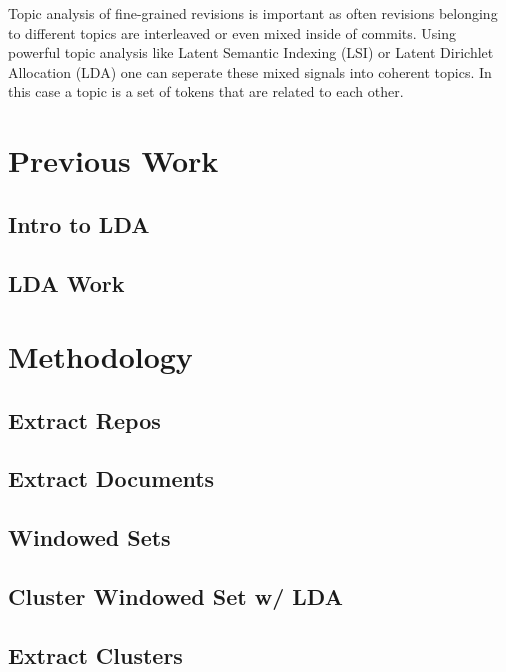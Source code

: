 \documentclass{report}
\begin{document}
Topic analysis of fine-grained revisions is important as often
revisions belonging to different topics are interleaved or even mixed
inside of commits. Using powerful topic analysis like Latent Semantic
Indexing (LSI) or Latent Dirichlet Allocation (LDA) one can seperate
these mixed signals into coherent topics. In this case a topic is a
set of tokens that are related to each other.

\section{Previous Work}
\subsection{Intro to LDA}

\subsection{LDA Work}



\section{Methodology}

\subsection{Extract Repos}
\subsection{Extract Documents}
\subsection{Windowed Sets}
\subsection{Cluster Windowed Set w/ LDA}
\subsection{Extract Clusters}
\end{document}
